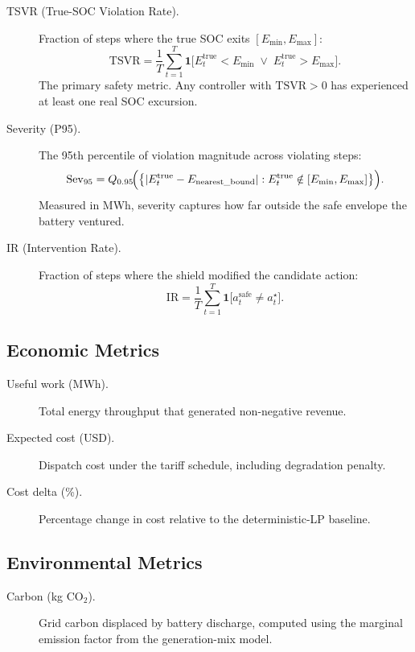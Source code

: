 \begin{description}
  \item[TSVR (True-SOC Violation Rate).]
    Fraction of steps where the true SOC exits $[E_{\min}, E_{\max}]$:
    \[
      \mathrm{TSVR} = \frac{1}{T}\sum_{t=1}^{T}
        \mathbf{1}\!\bigl[E_t^{\mathrm{true}} < E_{\min}
          \;\lor\; E_t^{\mathrm{true}} > E_{\max}\bigr].
    \]
    The primary safety metric.  Any controller with $\mathrm{TSVR} > 0$
    has experienced at least one real SOC excursion.

  \item[Severity (P95).]
    The 95th percentile of violation magnitude across violating steps:
    \[
      \mathrm{Sev}_{95} = Q_{0.95}\!\Bigl(\bigl\{
        |E_t^{\mathrm{true}} - E_{\mathrm{nearest\_bound}}|
        : E_t^{\mathrm{true}} \notin [E_{\min}, E_{\max}]\bigr\}\Bigr).
    \]
    Measured in MWh, severity captures how far outside the safe envelope
    the battery ventured.

  \item[IR (Intervention Rate).]
    Fraction of steps where the shield modified the candidate action:
    \[
      \mathrm{IR} = \frac{1}{T}\sum_{t=1}^{T}
        \mathbf{1}\!\bigl[a_t^{\mathrm{safe}} \neq a_t^\star\bigr].
    \]
\end{description}

\subsection{Economic Metrics}

\begin{description}
  \item[Useful work (MWh).]
    Total energy throughput that generated non-negative revenue.
  \item[Expected cost (USD).]
    Dispatch cost under the tariff schedule, including degradation penalty.
  \item[Cost delta (\%).]
    Percentage change in cost relative to the deterministic-LP baseline.
\end{description}

\subsection{Environmental Metrics}

\begin{description}
  \item[Carbon (kg CO$_2$).]
    Grid carbon displaced by battery discharge, computed using the
    marginal emission factor from the generation-mix model.
\end{description}

